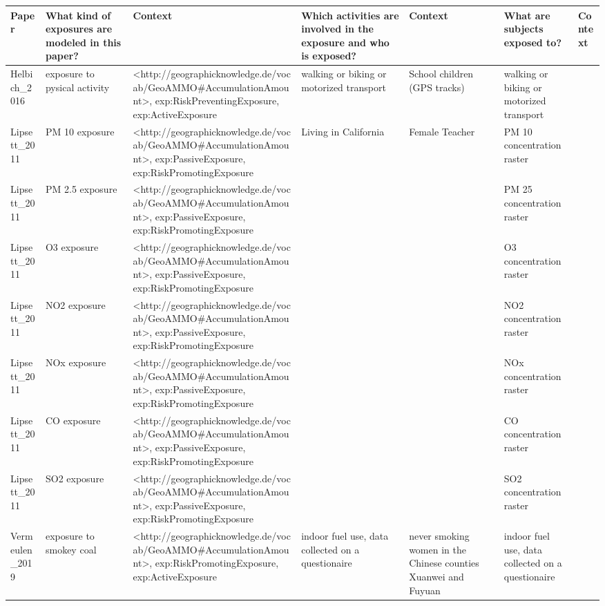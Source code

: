 \begin{tabular}{p{1cm}p{1cm}p{1cm}p{1cm}p{1cm}p{1cm}p{1cm}}
\toprule
          Paper & What kind of exposures are modeled in this paper? &                                                                                                          Context & Which activities are involved in the exposure and who is exposed? &                                                        Context &                     What are subjects exposed to? & Context \\
\midrule
Helbich\_2016 & exposure to pysical activity & <http://geographicknowledge.de/vocab/GeoAMMO\#AccumulationAmount>, exp:RiskPreventingExposure, exp:ActiveExposure & walking or biking or motorized transport & School children (GPS tracks) & walking or biking or motorized transport &  \\
Lipsett\_2011 & PM 10 exposure & <http://geographicknowledge.de/vocab/GeoAMMO\#AccumulationAmount>, exp:PassiveExposure, exp:RiskPromotingExposure & Living in California & Female Teacher & PM 10 concentration raster &  \\
Lipsett\_2011 & PM 2.5 exposure & <http://geographicknowledge.de/vocab/GeoAMMO\#AccumulationAmount>, exp:PassiveExposure, exp:RiskPromotingExposure &  &  & PM 25 concentration raster &  \\
Lipsett\_2011 & O3 exposure & <http://geographicknowledge.de/vocab/GeoAMMO\#AccumulationAmount>, exp:PassiveExposure, exp:RiskPromotingExposure &  &  & O3 concentration raster &  \\
Lipsett\_2011 & NO2 exposure & <http://geographicknowledge.de/vocab/GeoAMMO\#AccumulationAmount>, exp:PassiveExposure, exp:RiskPromotingExposure &  &  & NO2 concentration raster &  \\
Lipsett\_2011 & NOx exposure & <http://geographicknowledge.de/vocab/GeoAMMO\#AccumulationAmount>, exp:PassiveExposure, exp:RiskPromotingExposure &  &  & NOx concentration raster &  \\
Lipsett\_2011 & CO exposure & <http://geographicknowledge.de/vocab/GeoAMMO\#AccumulationAmount>, exp:PassiveExposure, exp:RiskPromotingExposure &  &  & CO concentration raster &  \\
Lipsett\_2011 & SO2 exposure & <http://geographicknowledge.de/vocab/GeoAMMO\#AccumulationAmount>, exp:PassiveExposure, exp:RiskPromotingExposure &  &  & SO2 concentration raster &  \\
Vermeulen\_2019 & exposure to smokey coal & <http://geographicknowledge.de/vocab/GeoAMMO\#AccumulationAmount>, exp:RiskPromotingExposure, exp:ActiveExposure & indoor fuel use, data collected on a questionaire & never smoking women in the Chinese counties Xuanwei and Fuyuan & indoor fuel use, data collected on a questionaire &  \\

\end{tabular}
